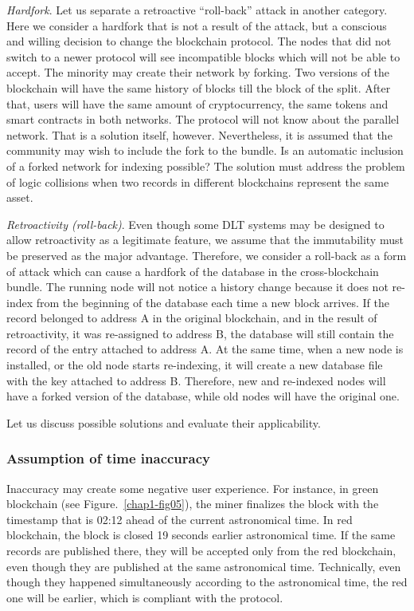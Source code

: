 \begin{multicols}{2}
\textit{Hardfork}. Let us separate a retroactive “roll-back” attack in another category. Here we consider a hardfork that is not a result of the attack, but a conscious and willing decision to change the blockchain protocol. The nodes that did not switch to a newer protocol will see incompatible blocks which will not be able to accept. The minority may create their network by forking. Two versions of the blockchain will have the same history of blocks till the block of the split. After that, users will have the same amount of cryptocurrency, the same tokens and smart contracts in both networks. The protocol will not know about the parallel network. That is a solution itself, however. Nevertheless, it is assumed that the community may wish to include the fork to the bundle. Is an automatic inclusion of a forked network for indexing possible? The solution must address the problem of logic collisions when two records in different blockchains represent the same asset.

\textit{Retroactivity (roll-back)}. Even though some DLT systems may be designed to allow retroactivity as a legitimate feature, we assume that the immutability must be preserved as the major advantage. Therefore, we consider a roll-back as a form of attack which can cause a hardfork of the database in the cross-blockchain bundle. The running node will not notice a history change because it does not re-index from the beginning of the database each time a new block arrives. If the record belonged to address A in the original blockchain, and in the result of retroactivity, it was re-assigned to address B, the database will still contain the record of the entry attached to address A. At the same time, when a new node is installed, or the old node starts re-indexing, it will create a new database file with the key attached to address B. Therefore, new and re-indexed nodes will have a forked version of the database, while old nodes will have the original one.

Let us discuss possible solutions and evaluate their applicability.

\vspace{-.3cm}

\subsubsection{Assumption of time inaccuracy}\label{subsubsec-4.3.b}

\vspace{-.5cm}

Inaccuracy may create some negative user experience. For instance, in green blockchain (see Figure.~\ref{chap1-fig05}), the miner finalizes the block with the timestamp that is 02:12 ahead of the current astronomical time. In red blockchain, the block is closed 19 seconds earlier astronomical time. If the same records are published there, they will be accepted only from the red blockchain, even though they are published at the same astronomical time. Technically, even though they happened simultaneously according to the astronomical time, the red one will be earlier, which is compliant with the protocol.
\end{multicols}
